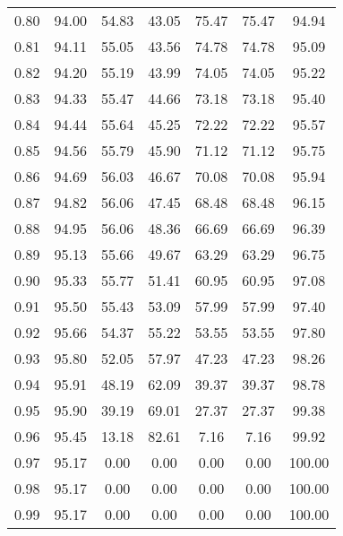 \begin{tabular}{|c|c|c|c|c|c|c|}
      0.80 &     94.00 &     54.83 &      43.05 &   75.47 &      75.47 &         94.94 \\
      0.81 &     94.11 &     55.05 &      43.56 &   74.78 &      74.78 &         95.09 \\
      0.82 &     94.20 &     55.19 &      43.99 &   74.05 &      74.05 &         95.22 \\
      0.83 &     94.33 &     55.47 &      44.66 &   73.18 &      73.18 &         95.40 \\
      0.84 &     94.44 &     55.64 &      45.25 &   72.22 &      72.22 &         95.57 \\
      0.85 &     94.56 &     55.79 &      45.90 &   71.12 &      71.12 &         95.75 \\
      0.86 &     94.69 &     56.03 &      46.67 &   70.08 &      70.08 &         95.94 \\
      0.87 &     94.82 &     56.06 &      47.45 &   68.48 &      68.48 &         96.15 \\
      0.88 &     94.95 &     56.06 &      48.36 &   66.69 &      66.69 &         96.39 \\
      0.89 &     95.13 &     55.66 &      49.67 &   63.29 &      63.29 &         96.75 \\
      0.90 &     95.33 &     55.77 &      51.41 &   60.95 &      60.95 &         97.08 \\
      0.91 &     95.50 &     55.43 &      53.09 &   57.99 &      57.99 &         97.40 \\
      0.92 &     95.66 &     54.37 &      55.22 &   53.55 &      53.55 &         97.80 \\
      0.93 &     95.80 &     52.05 &      57.97 &   47.23 &      47.23 &         98.26 \\
      0.94 &     95.91 &     48.19 &      62.09 &   39.37 &      39.37 &         98.78 \\
      0.95 &     95.90 &     39.19 &      69.01 &   27.37 &      27.37 &         99.38 \\
      0.96 &     95.45 &     13.18 &      82.61 &    7.16 &       7.16 &         99.92 \\
      0.97 &     95.17 &      0.00 &       0.00 &    0.00 &       0.00 &        100.00 \\
      0.98 &     95.17 &      0.00 &       0.00 &    0.00 &       0.00 &        100.00 \\
      0.99 &     95.17 &      0.00 &       0.00 &    0.00 &       0.00 &        100.00 \\
\bottomrule
\end{tabular}
